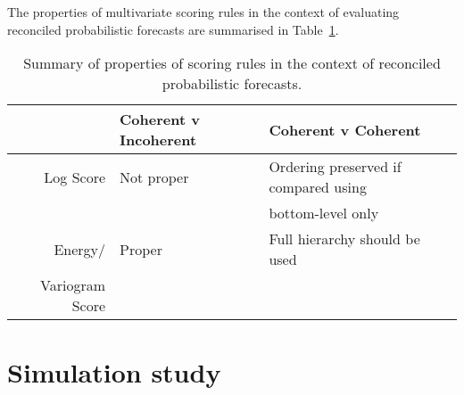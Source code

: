 \documentclass[12pt]{article}
\def\E{\text{E}}
\theoremstyle{definition}
\begin{document}
The properties of multivariate scoring rules in the context of evaluating reconciled probabilistic forecasts are summarised in Table~\ref{tab:prop}.

\begin{table}
	\centering
	\begin{tabular}{rll}
	& Coherent v Incoherent &Coherent v Coherent\\
	\hline
	Log Score & Not proper & Ordering preserved if compared using\\ &&bottom-level only\\
	Energy/ & Proper & Full hierarchy should be used\\
	Variogram Score & &\\
	\hline
    \end{tabular}
	\caption{Summary of properties of scoring rules in the context of reconciled probabilistic forecasts.}
	\label{tab:prop}
\end{table}

%
%

\section{Simulation study}\label{sec:gaussian}
\end{document}
